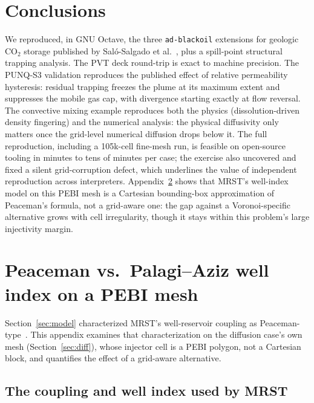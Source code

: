 \documentclass[preprint,11pt]{elsarticle}
\begin{document}
\section{Conclusions}
\label{sec:conclusions}

We reproduced, in GNU Octave, the three \texttt{ad-blackoil} extensions
for geologic CO$_2$ storage published by Sal\'o-Salgado et
al.~\cite{salo2024}, plus a spill-point structural trapping analysis.
The PVT deck round-trip is exact to machine precision. The PUNQ-S3
validation reproduces the published effect of relative permeability
hysteresis: residual trapping freezes the plume at its maximum extent
and suppresses the mobile gas cap, with divergence starting exactly at
flow reversal. The convective mixing example reproduces both the physics
(dissolution-driven density fingering) and the numerical analysis: the
physical diffusivity only matters once the grid-level numerical
diffusion drops below it. The full reproduction, including a 105k-cell
fine-mesh run, is feasible on open-source tooling in minutes to tens of
minutes per case; the exercise also uncovered and fixed a silent
grid-corruption defect, which underlines the value of independent
reproduction across interpreters. Appendix~\ref{app:wellindex} shows that
MRST's well-index model on this PEBI mesh is a Cartesian bounding-box
approximation of Peaceman's formula, not a grid-aware one: the gap against
a Voronoi-specific alternative grows with cell irregularity, though it
stays within this problem's large injectivity margin.

\appendix

\section{Peaceman vs.\ Palagi--Aziz well index on a PEBI mesh}
\label{app:wellindex}

Section~\ref{sec:model} characterized MRST's well-reservoir coupling as
Peaceman-type~\cite{peaceman1978}. This appendix examines that
characterization on the diffusion case's own mesh
(Section~\ref{sec:diff}), whose injector cell is a PEBI polygon, not a
Cartesian block, and quantifies the effect of a grid-aware alternative.

\subsection{The coupling and well index used by MRST}
\end{document}
